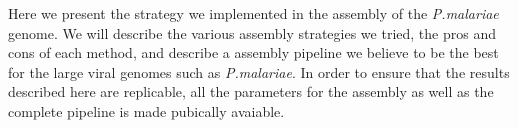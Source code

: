 \documentclass[12pt, a4paper]{article}
\begin{document}
Here we present the strategy we implemented in the assembly of the {\it P.malariae} genome. We will describe the various assembly strategies we tried, the pros and cons of each method, and describe a assembly pipeline we believe to be the best for the large viral genomes such as {\it P.malariae}. In order to ensure that the results described here are replicable, all the parameters for the assembly as well as the complete pipeline is made pubically avaiable.
\end{document}
